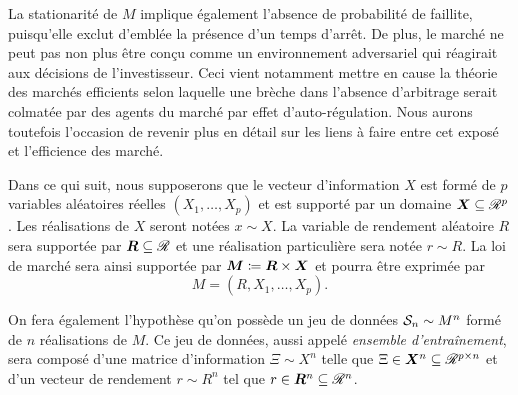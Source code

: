 La stationarité de $M$ implique également l'absence de probabilité de faillite,
puisqu'elle exclut d'emblée la présence d'un temps d'arrêt. De plus, le marché ne peut pas
non plus être conçu comme un environnement adversariel qui réagirait aux décisions de
l'investisseur. Ceci vient notamment mettre en cause la théorie des marchés efficients
selon laquelle une brèche dans l'absence d'arbitrage serait colmatée par des agents du
marché par effet d'auto-régulation. Nous aurons toutefois l'occasion de revenir plus en
détail sur les liens à faire entre cet exposé et l'efficience des marché.

Dans ce qui suit, nous supposerons que le vecteur d'information $X$ est formé de $p$
variables aléatoires réelles $(X_1,\ldots,X_p)$ et est supporté par un domaine
$\X \subseteq \Re^p$. Les réalisations de $X$ seront notées $x \sim X$. La variable de rendement
aléatoire $R$ sera supportée par $\R \subseteq \Re$ et une réalisation particulière sera notée
$r \sim R$.  La loi de marché sera ainsi supportée par $\M \coloneq \R \times \X$ et pourra être
exprimée par
\begin{equation}
  M = (R,X_1, \ldots, X_p).
\end{equation}

On fera également l'hypothèse qu'on possède un jeu de données $\S_n \sim M^n$ formé de $n$
réalisations de $M$. Ce jeu de données, aussi appelé \textit{ensemble d'entraînement},
sera composé d'une matrice d'information $\Xi \sim X^n$ telle que
$\Xi \in \X^n \subseteq \Re^{p \times n}$ et d'un vecteur de rendement $r \sim R^n$ tel que $r \in \R^n \subseteq \Re^n$.

